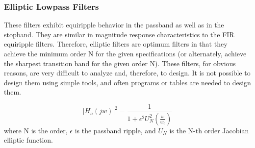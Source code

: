 \documentclass{article}
\begin{document}
\subsubsection{Elliptic Lowpass Filters}
These filters exhibit equiripple behavior in the passband as well as in
the stopband. They are similar in magnitude response characteristics to
the FIR equiripple filters. Therefore, elliptic filters are optimum filters
in that they achieve the minimum order N for the given specifications
(or alternately, achieve the sharpest transition band for the given order
N). These filters, for obvious reasons, are very difficult to analyze and,
therefore, to design. It is not possible to design them using simple tools,
and often programs or tables are needed to design them.

\begin{equation}
|H_a(jw)|^2=\frac{1}{1+\epsilon^2U_N^2(\frac{w}{w_c})}
\end{equation}
where N is the order, $\epsilon$ is the passband ripple, and $U_N$ is the N-th order Jacobian elliptic function.
\end{document}
